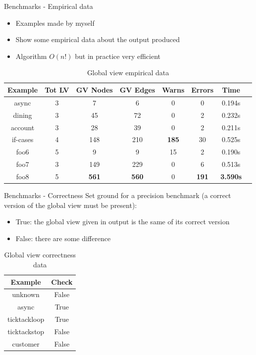 \documentclass{beamer}
\begin{document}
\begin{frame}{Benchmarks - Empirical data}
\begin{itemize}
    \item Examples made by myself
    \item Show some empirical data about the output produced
    \item Algorithm $O(n!)$ but in practice very efficient 
\end{itemize}

\begin{table}[!ht]
\centering
\begin{tabular}{|c|c|c|c|c|c|c|c|}
\hline
Example & Tot LV & GV Nodes & GV Edges & Warns & Errors & Time \\ 
\hline
async & 3 & 7 & 6 & 0 & 0 & 0.194s \\ 
dining & 3 & 45 & 72 & 0 & 2 & 0.232s \\ 
account & 3 & 28 & 39 & 0 & 2 & 0.211s \\ 
if-cases & 4 & 148 & 210 & \textbf{185} & 30 & 0.525s \\ 
foo6 & 5 & 9 & 9 & 15 & 2 & 0.190s \\ 
foo7 & 3 & 149 & 229 & 0 & 6 & 0.513s \\ 
foo8 & 5 & \textbf{561} & \textbf{560} & 0 & \textbf{191} & \textbf{3.590s} \\ 
\hline
\end{tabular}
\caption{Global view empirical data}
\label{tab:gvbench}
\end{table}
\end{frame}


\begin{frame}{Benchmarks - Correctness}
Set ground for a precision benchmark (a correct version of the 
global view must be present):
\begin{itemize}
    \item True: the global view given in output is the same of its
    correct version
    \item False: there are some difference
\end{itemize}

\begin{table}[!ht]
\centering
\begin{tabular}{|c|c|}
\hline
Example & Check \\ 
\hline
unknown & False \\ 
async & True \\ 
ticktackloop & True \\ 
ticktackstop & False \\ 
customer & False \\ 
\hline
\end{tabular}
\caption{Global view correctness data}
\label{tab:corrbench}
\end{table}
\end{frame}
\end{document}
